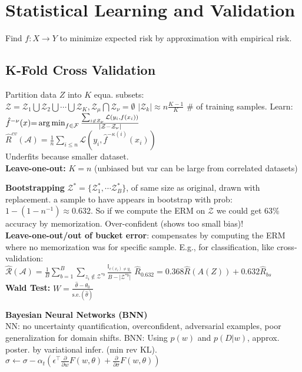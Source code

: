 \section*{Statistical Learning and Validation}

Find $f: X \to Y$ to minimize expected risk by approximation with empirical risk.

\subsection*{K-Fold Cross Validation}
Partition data $Z$ into $K$ equa. subsets:\\
$\mathcal{Z}=\mathcal{Z}_1\bigcup\mathcal{Z}_2\bigcup\cdots\bigcup\mathcal{Z}_K, \mathcal{Z}_\mu \bigcap\mathcal{Z}_\nu = \emptyset $
$|\mathcal{Z}_k|\approx n\frac{K-1}{K}$ \# of training samples. Learn:
$\hat{f}^{-\nu}(x){=} \operatorname*{arg\,min}_{f\in\mathcal{F}}\frac{\sum_{i\not\in\mathcal{Z}_\nu}\mathcal{L}(y_i,f(x_i))}{|\mathcal{Z}-\mathcal{Z}_{\nu}|}$\\
$\hat{R}^{cv}(\mathcal{A}) = \frac{1}{n}\sum_{i\leq n}\mathcal{L}(y_i,\hat{f}^{-\kappa(i)}(x_i))$\\
Underfits because smaller dataset.\\
\textbf{Leave-one-out:} $K=n$ (unbiased but var can be large from correlated datasets)

\textbf{Bootstrapping} $\mathcal{Z}^*=\{\mathcal{Z}_1^*, \cdots\mathcal{Z}_B^*\}$, of same size as original, drawn with replacement.
a sample to have appears in bootstrap with prob: $1{-}(1{-}n^{-1}){\approx} 0.632$. So if we compute the ERM on $\mathcal{Z}$ we could get 63\% accuracy by memorization. Over-confident (shows too small bias)!\\
\textbf{Leave-one-out/out of bucket error}: compensates by computing the ERM where no memorization was for specific sample. E.g., for classification, like cross-validation:\\
$\hat{\mathcal{R}}(\mathcal{A})=\frac{1}{B}\sum_{b=1}^B\sum_{z_i\not\in\mathcal{Z}^{*b}}\frac{\mathbb{I}_{c(x_i)\neq y_i}}{B-\lvert\mathcal{Z}^{*b}\rvert}$
$\hat{R}_{0.632} = 0.368 \hat{R}(A(Z)) + 0.632 \hat{R}_{bs}$ \\
\textbf{Wald Test: }$W = \frac{\hat{\theta} - \theta_0}{\text{s.e.}(\hat{\theta})}$

\textbf{Bayesian Neural Networks (BNN)} \\
NN: no uncertainty quantification, overconfident, adversarial examples, poor generalization for domain shifts.
BNN: Using $p(w)$ and $p(D|w)$, approx. poster. by variational infer. (min rev KL).
$\sigma {\leftarrow} \sigma {-} \alpha_t \left( \epsilon^\top \frac{\partial}{\partial w} F(w, \theta) + \frac{\partial}{\partial \sigma} F(w, \theta) \right)$

